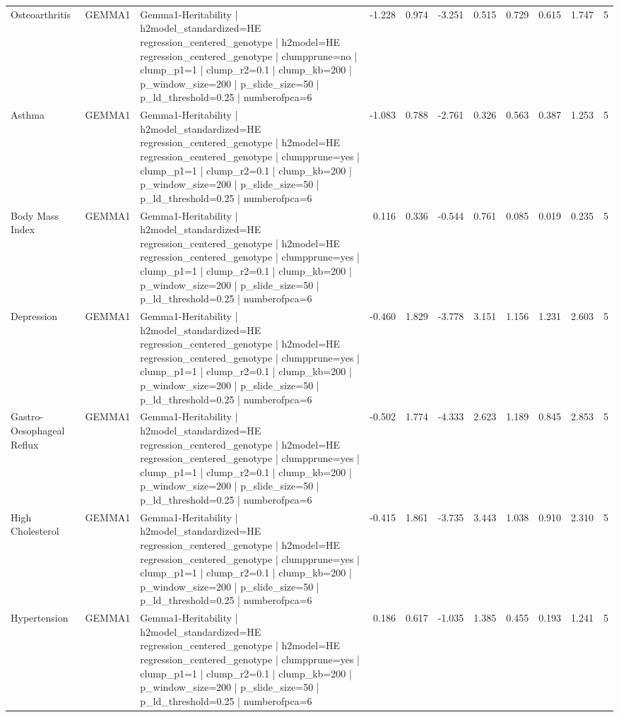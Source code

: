 \begin{landscape}
\begin{longtable}{p{2.4cm}p{1.8cm}p{6.0cm}rrrrrrrr}
Osteoarthritis & GEMMA1 & Gemma1-Heritability | h2model\_standardized=HE regression\_centered\_genotype | h2model=HE regression\_centered\_genotype | clumpprune=no | clump\_p1=1 | clump\_r2=0.1 | clump\_kb=200 | p\_window\_size=200 | p\_slide\_size=50 | p\_ld\_threshold=0.25 | numberofpca=6 & -1.228 & 0.974 & -3.251 & 0.515 & 0.729 & 0.615 & 1.747 & 5 \\
Asthma & GEMMA1 & Gemma1-Heritability | h2model\_standardized=HE regression\_centered\_genotype | h2model=HE regression\_centered\_genotype | clumpprune=yes | clump\_p1=1 | clump\_r2=0.1 | clump\_kb=200 | p\_window\_size=200 | p\_slide\_size=50 | p\_ld\_threshold=0.25 | numberofpca=6 & -1.083 & 0.788 & -2.761 & 0.326 & 0.563 & 0.387 & 1.253 & 5 \\
Body Mass Index & GEMMA1 & Gemma1-Heritability | h2model\_standardized=HE regression\_centered\_genotype | h2model=HE regression\_centered\_genotype | clumpprune=yes | clump\_p1=1 | clump\_r2=0.1 | clump\_kb=200 | p\_window\_size=200 | p\_slide\_size=50 | p\_ld\_threshold=0.25 | numberofpca=6 & 0.116 & 0.336 & -0.544 & 0.761 & 0.085 & 0.019 & 0.235 & 5 \\
Depression & GEMMA1 & Gemma1-Heritability | h2model\_standardized=HE regression\_centered\_genotype | h2model=HE regression\_centered\_genotype | clumpprune=yes | clump\_p1=1 | clump\_r2=0.1 | clump\_kb=200 | p\_window\_size=200 | p\_slide\_size=50 | p\_ld\_threshold=0.25 | numberofpca=6 & -0.460 & 1.829 & -3.778 & 3.151 & 1.156 & 1.231 & 2.603 & 5 \\
Gastro-Oesophageal Reflux & GEMMA1 & Gemma1-Heritability | h2model\_standardized=HE regression\_centered\_genotype | h2model=HE regression\_centered\_genotype | clumpprune=yes | clump\_p1=1 | clump\_r2=0.1 | clump\_kb=200 | p\_window\_size=200 | p\_slide\_size=50 | p\_ld\_threshold=0.25 | numberofpca=6 & -0.502 & 1.774 & -4.333 & 2.623 & 1.189 & 0.845 & 2.853 & 5 \\
High Cholesterol & GEMMA1 & Gemma1-Heritability | h2model\_standardized=HE regression\_centered\_genotype | h2model=HE regression\_centered\_genotype | clumpprune=yes | clump\_p1=1 | clump\_r2=0.1 | clump\_kb=200 | p\_window\_size=200 | p\_slide\_size=50 | p\_ld\_threshold=0.25 | numberofpca=6 & -0.415 & 1.861 & -3.735 & 3.443 & 1.038 & 0.910 & 2.310 & 5 \\
Hypertension & GEMMA1 & Gemma1-Heritability | h2model\_standardized=HE regression\_centered\_genotype | h2model=HE regression\_centered\_genotype | clumpprune=yes | clump\_p1=1 | clump\_r2=0.1 | clump\_kb=200 | p\_window\_size=200 | p\_slide\_size=50 | p\_ld\_threshold=0.25 | numberofpca=6 & 0.186 & 0.617 & -1.035 & 1.385 & 0.455 & 0.193 & 1.241 & 5 \\

\end{longtable}
\end{landscape}
